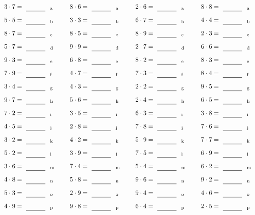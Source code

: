 \documentclass
[
  draft    = true,
  fontsize = 11pt,
  parskip  = half-
]
{scrartcl}
\begin{document}
\par\vfill\par
\begin{align*}
    \pline{3\cdot7}&=\rline{a}
  & \pline{8\cdot6}&=\rline{a}
  & \pline{2\cdot6}&=\rline{a}
  & \pline{8\cdot8}&=\rline{a} \\[1ex]
    \pline{5\cdot5}&=\rline{b}
  & \pline{3\cdot3}&=\rline{b}
  & \pline{6\cdot7}&=\rline{b}
  & \pline{4\cdot4}&=\rline{b} \\[1ex]
    \pline{8\cdot7}&=\rline{c}
  & \pline{8\cdot5}&=\rline{c}
  & \pline{8\cdot9}&=\rline{c}
  & \pline{2\cdot3}&=\rline{c} \\[1ex]
    \pline{5\cdot7}&=\rline{d}
  & \pline{9\cdot9}&=\rline{d}
  & \pline{2\cdot7}&=\rline{d}
  & \pline{6\cdot6}&=\rline{d} \\[1ex]
    \pline{9\cdot3}&=\rline{e}
  & \pline{6\cdot8}&=\rline{e}
  & \pline{8\cdot2}&=\rline{e}
  & \pline{8\cdot3}&=\rline{e} \\[1ex]
    \pline{7\cdot9}&=\rline{f}
  & \pline{4\cdot7}&=\rline{f}
  & \pline{7\cdot3}&=\rline{f}
  & \pline{8\cdot4}&=\rline{f} \\[1ex]
    \pline{3\cdot4}&=\rline{g}
  & \pline{4\cdot3}&=\rline{g}
  & \pline{2\cdot2}&=\rline{g}
  & \pline{9\cdot5}&=\rline{g} \\[1ex]
    \pline{9\cdot7}&=\rline{h}
  & \pline{5\cdot6}&=\rline{h}
  & \pline{2\cdot4}&=\rline{h}
  & \pline{6\cdot5}&=\rline{h} \\[1ex]
    \pline{7\cdot2}&=\rline{i}
  & \pline{3\cdot5}&=\rline{i}
  & \pline{6\cdot3}&=\rline{i}
  & \pline{3\cdot8}&=\rline{i} \\[1ex]
    \pline{4\cdot5}&=\rline{j}
  & \pline{2\cdot8}&=\rline{j}
  & \pline{7\cdot8}&=\rline{j}
  & \pline{7\cdot6}&=\rline{j} \\[1ex]
    \pline{3\cdot2}&=\rline{k}
  & \pline{4\cdot2}&=\rline{k}
  & \pline{5\cdot9}&=\rline{k}
  & \pline{7\cdot7}&=\rline{k} \\[1ex]
    \pline{5\cdot2}&=\rline{l}
  & \pline{3\cdot9}&=\rline{l}
  & \pline{7\cdot5}&=\rline{l}
  & \pline{6\cdot9}&=\rline{l} \\[1ex]
    \pline{3\cdot6}&=\rline{m}
  & \pline{7\cdot4}&=\rline{m}
  & \pline{5\cdot4}&=\rline{m}
  & \pline{6\cdot2}&=\rline{m} \\[1ex]
    \pline{4\cdot8}&=\rline{n}
  & \pline{5\cdot8}&=\rline{n}
  & \pline{9\cdot6}&=\rline{n}
  & \pline{9\cdot2}&=\rline{n} \\[1ex]
    \pline{5\cdot3}&=\rline{o}
  & \pline{2\cdot9}&=\rline{o}
  & \pline{9\cdot4}&=\rline{o}
  & \pline{4\cdot6}&=\rline{o} \\[1ex]
    \pline{4\cdot9}&=\rline{p}
  & \pline{9\cdot8}&=\rline{p}
  & \pline{6\cdot4}&=\rline{p}
  & \pline{2\cdot5}&=\rline{p}
\end{align*}
\end{document}
